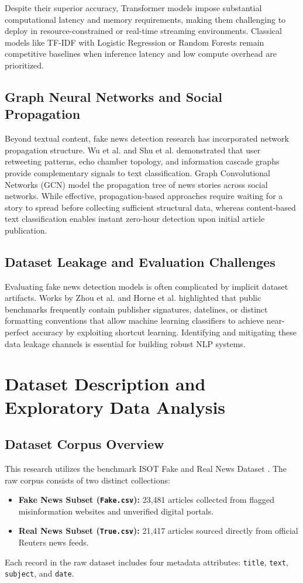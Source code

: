 \documentclass[conference]{IEEEtran}
\begin{document}
Despite their superior accuracy, Transformer models impose substantial computational latency and memory requirements, making them challenging to deploy in resource-constrained or real-time streaming environments. Classical models like TF-IDF with Logistic Regression or Random Forests remain competitive baselines when inference latency and low compute overhead are prioritized.

\subsection{Graph Neural Networks and Social Propagation}
Beyond textual content, fake news detection research has incorporated network propagation structure. Wu et al. \cite{wu2019} and Shu et al. \cite{shu2019} demonstrated that user retweeting patterns, echo chamber topology, and information cascade graphs provide complementary signals to text classification. Graph Convolutional Networks (GCN) model the propagation tree of news stories across social networks. While effective, propagation-based approaches require waiting for a story to spread before collecting sufficient structural data, whereas content-based text classification enables instant zero-hour detection upon initial article publication.

\subsection{Dataset Leakage and Evaluation Challenges}
Evaluating fake news detection models is often complicated by implicit dataset artifacts. Works by Zhou et al. \cite{zhou2020} and Horne et al. \cite{horne2017} highlighted that public benchmarks frequently contain publisher signatures, datelines, or distinct formatting conventions that allow machine learning classifiers to achieve near-perfect accuracy by exploiting shortcut learning. Identifying and mitigating these data leakage channels is essential for building robust NLP systems.

\section{Dataset Description and Exploratory Data Analysis}

\subsection{Dataset Corpus Overview}
This research utilizes the benchmark ISOT Fake and Real News Dataset \cite{isot}. The raw corpus consists of two distinct collections:
\begin{itemize}
    \item \textbf{Fake News Subset (\texttt{Fake.csv}):} 23,481 articles collected from flagged misinformation websites and unverified digital portals.
    \item \textbf{Real News Subset (\texttt{True.csv}):} 21,417 articles sourced directly from official Reuters news feeds.
\end{itemize}
Each record in the raw dataset includes four metadata attributes: \texttt{title}, \texttt{text}, \texttt{subject}, and \texttt{date}.
\end{document}

